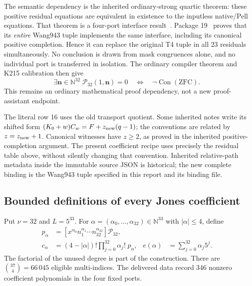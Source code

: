 The semantic dependency is the inherited ordinary-strong quartic theorem:
these positive residual equations are equivalent in existence to the
inputless native/Pell equations. That theorem is a four-port interface
result~\cite{p18,arithmetic}. Package 19~\cite{p19} proves that its \emph{entire} Wang943 tuple implements
the same interface, including its canonical positive completion. Hence it
can replace the original T4 tuple in all 23 residuals simultaneously.
No conclusion is drawn from mask congruences alone, and no individual port
is transferred in isolation. The ordinary compiler theorem and K215
calibration then give
\[
 \exists\mathbf n\in\mathbb N^{32}\;\mathcal P_{32}(1,\mathbf n)=0
 \quad\Longleftrightarrow\quad \neg\operatorname{Con}(\mathrm{ZFC}).
\]
This remains an ordinary mathematical proof dependency, not a new
proof-assistant endpoint.

The literal row 16 uses the old transport quotient. Some inherited notes
write its shifted form $(K_0+w)C_w=F+z_{\rm new}(q-1)$; the conventions are
related by $z=z_{\rm new}+1$. Canonical witnesses have $z\ge2$, as proved
in the inherited positive-completion argument. The present coefficient
recipe uses precisely the residual table above, without silently changing
that convention. Inherited relative-path metadata inside the immutable
source JSON is historical; the new complete binding is the Wang943 tuple
specified in this report and its binding file.

\subsection{Bounded definitions of every Jones coefficient}

Put $\nu=32$ and $L=5^{33}$. For
$\alpha=(\alpha_0,\ldots,\alpha_{32})\in\mathbb N^{33}$ with
$|\alpha|\le4$, define
\begin{align*}
 p_\alpha&=[x^{\alpha_0}n_1^{\alpha_1}\cdots n_{32}^{\alpha_{32}}]
                 \mathcal P_{32},\\
 c_\alpha&=(4-|\alpha|)!\prod_{j=0}^{32}\alpha_j!\;p_\alpha,
 &e(\alpha)&=\sum_{j=0}^{32}\alpha_j5^j.
\end{align*}
The factorial of the unused degree is part of the construction. There are
$\binom{37}{4}=66\,045$ eligible multi-indices. The delivered data record
346 nonzero coefficient polynomials in the four fixed ports.

